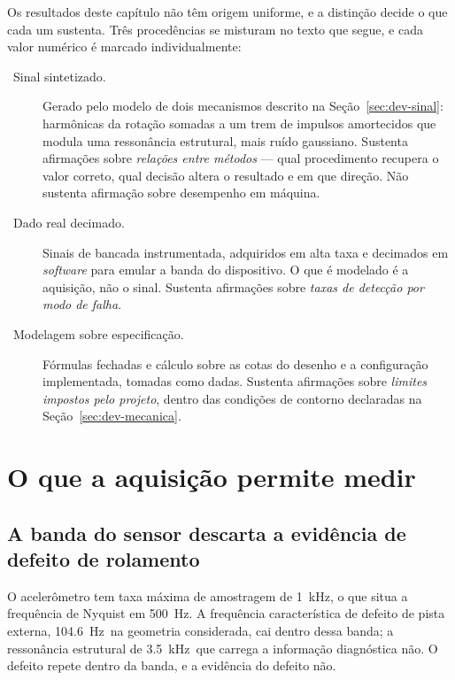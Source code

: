 Os resultados deste capítulo não têm origem uniforme, e a distinção decide o que cada um
sustenta. Três procedências se misturam no texto que segue, e cada valor numérico é
marcado individualmente:

\begin{description}
  \item[\pS\ Sinal sintetizado.] Gerado pelo modelo de dois mecanismos descrito na
        Seção~\ref{sec:dev-sinal}: harmônicas da rotação somadas a um trem de impulsos amortecidos que
        modula uma ressonância estrutural, mais ruído gaussiano. Sustenta afirmações sobre
        \emph{relações entre métodos} --- qual procedimento recupera o valor correto, qual
        decisão altera o resultado e em que direção. Não sustenta afirmação sobre
        desempenho em máquina.
  \item[\pM\ Dado real decimado.] Sinais de bancada instrumentada, adquiridos em alta taxa
        e decimados em \emph{software} para emular a banda do dispositivo. O que é
        modelado é a aquisição, não o sinal. Sustenta afirmações sobre \emph{taxas de
        detecção por modo de falha}.
  \item[\pE\ Modelagem sobre especificação.] Fórmulas fechadas e cálculo sobre as cotas do
        desenho e a configuração implementada, tomadas como dadas. Sustenta afirmações
        sobre \emph{limites impostos pelo projeto}, dentro das condições de contorno
        declaradas na Seção~\ref{sec:dev-mecanica}.
\end{description}


\section{O que a aquisição permite medir}
\label{sec:res-aquisicao}

\subsection{A banda do sensor descarta a evidência de defeito de rolamento}

O acelerômetro tem taxa máxima de amostragem de \SI{1}{\kilo\hertz}\pE, o que situa a
frequência de Nyquist em \SI{500}{\hertz}\pE. A frequência característica de defeito de
pista externa, \SI{104,6}{\hertz}\pE\ na geometria considerada, cai dentro dessa banda; a
ressonância estrutural de \SI{3,5}{\kilo\hertz}\pS\ que carrega a informação diagnóstica
não. O defeito repete dentro da banda, e a evidência do defeito não.

